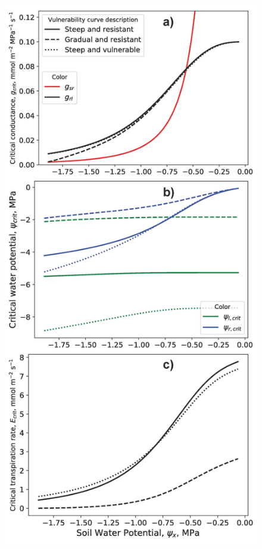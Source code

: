 \documentclass[utf8]{frontiersSCNS} %
\begin{document}
\begin{figure}[h]
    \begin{center}
        \includegraphics[scale=0.5]{g_psi_E_psix.jpg}
    \end{center}

\end{figure}
\end{document}
